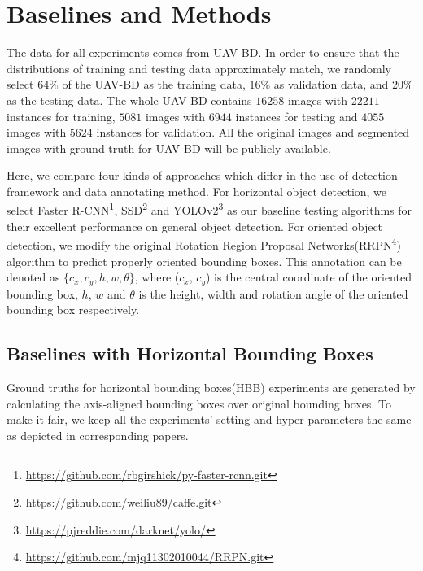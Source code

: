 \section{Baselines and Methods}
\label{sec:exp}


The data for all experiments comes from UAV-BD. In order to ensure that the distributions of training and testing data approximately match, we randomly select $ 64\% $ of the UAV-BD as the training data, $ 16\% $ as validation data, and $ 20\% $ as the testing data. The whole UAV-BD contains $ 16258 $ images with $ 22211 $ instances for training, $ 5081 $ images with $ 6944 $ instances for testing and $ 4055 $ images with $ 5624 $ instances for validation. All the original images and segmented images with ground truth for UAV-BD will be publicly available.


Here, we compare four kinds of approaches which differ in the use of detection framework and data annotating method. For horizontal object detection, we select Faster R-CNN\footnote{\url{https://github.com/rbgirshick/py-faster-rcnn.git}}\cite{FasterRCNN},  SSD\footnote{\url{https://github.com/weiliu89/caffe.git}}\cite{SSD} and YOLOv2\footnote{\url{https://pjreddie.com/darknet/yolo/}}\cite{YOLOv2} as our baseline testing algorithms for their excellent performance on general object detection. For oriented object detection, we modify the original Rotation Region Proposal Networks(RRPN\footnote{\url{https://github.com/mjq11302010044/RRPN.git}}) algorithm\cite{RRPN} to predict properly oriented bounding boxes. This annotation can be denoted as $ \{c_x, c_y, h, w, \theta\} $, where ($ c_x $, $ c_y $) is the central coordinate of the oriented bounding box, $ h $, $ w $ and $ \theta $ is the height, width and rotation angle of the oriented bounding box respectively.


\subsection{Baselines with Horizontal Bounding Boxes}

Ground truths for horizontal bounding boxes(HBB) experiments are generated by calculating the axis-aligned bounding boxes over original bounding boxes. To make it fair, we keep all the experiments' setting and hyper-parameters the same as depicted in corresponding papers\cite{FasterRCNN, SSD, YOLOv2}.

